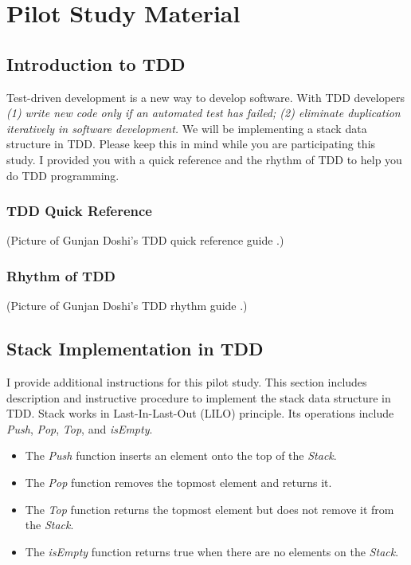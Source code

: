\appendix
\chapter{Pilot Study Material}
\label{app:PilotStudyMaterial}
\section{Introduction to TDD}
Test-driven development is a new way to develop software. With TDD
developers \textit {(1) write new code only if an automated test has
failed; (2) eliminate duplication iteratively in software
development.} We will be implementing a stack data structure in TDD.
Please keep this in mind while you are participating this study. I
provided you with a quick reference \cite{TDDQuickReference} and the
rhythm of TDD \cite{TDDRhythm} to help you do TDD programming.
\subsection{TDD Quick Reference}

(Picture of Gunjan Doshi's TDD quick reference guide \cite{TDDQuickReference}.)

\subsection{Rhythm of TDD}

(Picture of Gunjan Doshi's TDD rhythm guide \cite{TDDRhythm}.)

\section{Stack Implementation in TDD}
I provide additional instructions for this pilot study. This section
includes description and instructive procedure to implement the stack
data structure in TDD. Stack works in Last-In-Last-Out (LILO)
principle. Its operations include
\textit{Push}, \textit{Pop}, \textit{Top}, and \textit{isEmpty}.
\begin{itemize}
\item The \textit{Push} function inserts an element onto the top of the \textit{Stack}.
\item The \textit{Pop} function removes the topmost element and returns it.  
\item The \textit{Top} function returns the topmost element but does not remove it from the \textit{Stack}.
\item The \textit{isEmpty} function returns true when there are no elements on the \textit{Stack}.
\end{itemize}

